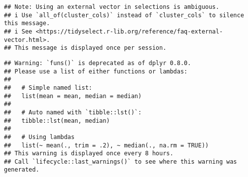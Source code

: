 \documentclass[
]{article}
\begin{document}
\begin{verbatim}
## Note: Using an external vector in selections is ambiguous.
## i Use `all_of(cluster_cols)` instead of `cluster_cols` to silence this message.
## i See <https://tidyselect.r-lib.org/reference/faq-external-vector.html>.
## This message is displayed once per session.
\end{verbatim}

\begin{verbatim}
## Warning: `funs()` is deprecated as of dplyr 0.8.0.
## Please use a list of either functions or lambdas: 
## 
##   # Simple named list: 
##   list(mean = mean, median = median)
## 
##   # Auto named with `tibble::lst()`: 
##   tibble::lst(mean, median)
## 
##   # Using lambdas
##   list(~ mean(., trim = .2), ~ median(., na.rm = TRUE))
## This warning is displayed once every 8 hours.
## Call `lifecycle::last_warnings()` to see where this warning was generated.
\end{verbatim}
\end{document}
